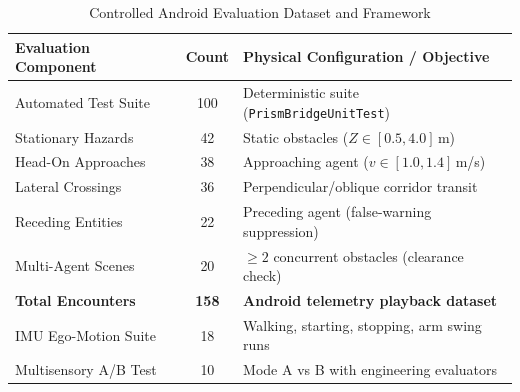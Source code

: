 \begin{table}[!t]
\caption{Controlled Android Evaluation Dataset and Framework}
\label{tab:evaluation_setup}
\centering
\scriptsize
\setlength{\tabcolsep}{2.5pt}
\begin{tabularx}{\columnwidth}{l c X}
\toprule
\textbf{Evaluation Component} & \textbf{Count} & \textbf{Physical Configuration / Objective} \\
\midrule
Automated Test Suite   & 100 & Deterministic suite (\texttt{PrismBridgeUnitTest}) \\
Stationary Hazards     & 42  & Static obstacles ($Z \in [0.5, 4.0]$\,m) \\
Head-On Approaches     & 38  & Approaching agent ($v \in [1.0, 1.4]$\,m/s) \\
Lateral Crossings      & 36  & Perpendicular/oblique corridor transit \\
Receding Entities      & 22  & Preceding agent (false-warning suppression) \\
Multi-Agent Scenes     & 20  & $\ge 2$ concurrent obstacles (clearance check) \\
\midrule
\textbf{Total Encounters} & \textbf{158} & \textbf{Android telemetry playback dataset} \\
\midrule
IMU Ego-Motion Suite   & 18  & Walking, starting, stopping, arm swing runs \\
Multisensory A/B Test  & 10  & Mode A vs B with engineering evaluators \\
\bottomrule
\end{tabularx}
\par{}
\end{table}
